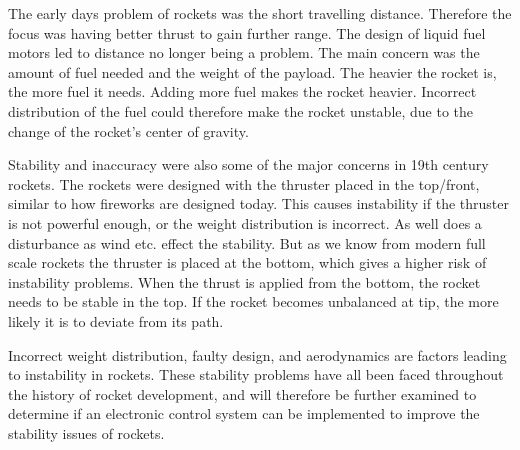 The early days problem of rockets was the short travelling distance. Therefore the focus was having better thrust to gain further range. The design of liquid fuel motors led to distance no longer being a problem. The main concern was the amount of fuel needed and the weight of the payload. The heavier the rocket is, the more fuel it needs. Adding more fuel makes the rocket heavier. Incorrect distribution of the fuel could therefore make the rocket unstable, due to the change of the rocket's center of gravity.


Stability and inaccuracy were also some of the major concerns in 19th century rockets. The rockets were designed with the thruster placed in the top/front, similar to how fireworks are designed today. This causes instability if the thruster is not powerful enough, or the weight distribution is incorrect. As well does a disturbance as wind etc. effect the stability. But as we know from modern full scale rockets the thruster is placed at the bottom, which gives a higher risk of instability problems. When the thrust is applied from the bottom, the rocket needs to be stable in the top. If the rocket becomes unbalanced at tip, the more likely it is to deviate from its path. 



\bigbreak
Incorrect weight distribution, faulty design, and aerodynamics are factors leading to instability in rockets. These stability problems have all been faced throughout the history of rocket development, and will therefore be further examined to determine if an electronic control system can be implemented to improve the stability issues of rockets.



